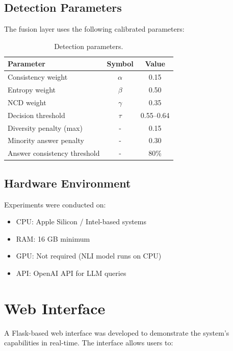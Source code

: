 \subsection{Detection Parameters}

The fusion layer uses the following calibrated parameters:

\begin{table}[!htbp]
    \centering
    \caption{Detection parameters.}
    \label{tab:det_params}
    \begin{tabular}{lcc}
        \toprule
        Parameter & Symbol & Value \\
        \midrule
        Consistency weight & $\alpha$ & 0.15 \\
        Entropy weight & $\beta$ & 0.50 \\
        NCD weight & $\gamma$ & 0.35 \\
        Decision threshold & $\tau$ & 0.55--0.64 \\
        Diversity penalty (max) & - & 0.15 \\
        Minority answer penalty & - & 0.30 \\
        Answer consistency threshold & - & 80\% \\
        \bottomrule
    \end{tabular}
\end{table}

\subsection{Hardware Environment}

Experiments were conducted on:

\begin{itemize}
    \item CPU: Apple Silicon / Intel-based systems
    \item RAM: 16 GB minimum
    \item GPU: Not required (NLI model runs on CPU)
    \item API: OpenAI API for LLM queries
\end{itemize}

\section{Web Interface}

A Flask-based web interface was developed to demonstrate the system's capabilities in real-time. The interface allows users to:

